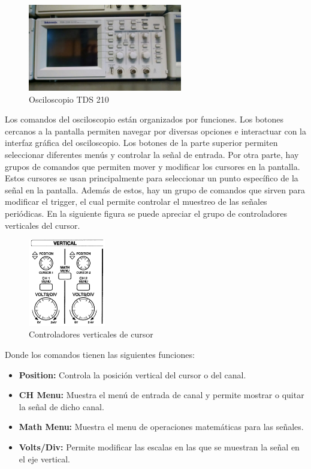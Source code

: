 \documentclass{scrartcl}
\begin{document}
\begin{figure}[h!]
	\centering
	\includegraphics[width=0.6\textwidth,height=0.25\textheight]{osciloscopio.jpg}
	\caption{Osciloscopio TDS 210}
\end{figure}

Los comandos del osciloscopio están organizados por funciones. Los botones cercanos a la pantalla permiten navegar por diversas opciones e interactuar con la interfaz gráfica del osciloscopio. Los botones de la parte superior permiten seleccionar diferentes menús y controlar la señal de entrada. Por otra parte, hay grupos de comandos que permiten mover y modificar los cursores en la pantalla. Estos cursores se usan principalmente para seleccionar un punto específico de la señal en la pantalla. Además de estos, hay un grupo de comandos que sirven para modificar el trigger, el cual permite controlar el muestreo de las señales periódicas. En la siguiente figura se puede apreciar el grupo de controladores verticales del cursor.\\

\begin{figure}[h!]
	\centering
	\includegraphics[width=0.3\textwidth,height=0.25\textheight]{Osci-vertical}
	\caption{Controladores verticales de cursor}
\end{figure}

Donde los comandos tienen las siguientes funciones:
\begin{itemize}
	\item \textbf{Position:} Controla la posición vertical del cursor o del canal. 
	\item \textbf{CH Menu:} Muestra el menú de entrada de canal y permite mostrar o quitar la señal de dicho canal.
	\item \textbf{Math Menu:} Muestra el menu de operaciones matemáticas para las señales.
	\item \textbf{Volts/Div:} Permite modificar las escalas en las que se muestran la señal en el eje vertical.

\end{itemize}
\end{document}
